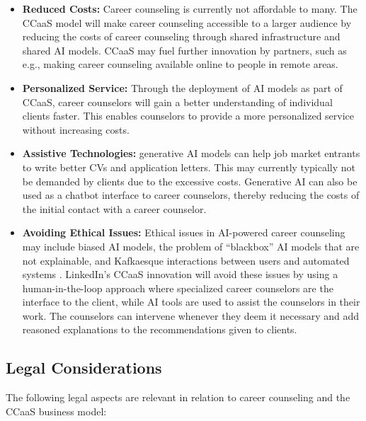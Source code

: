 \begin{itemize}
    \item \textbf{Reduced Costs:} Career counseling is currently not affordable to many. The CCaaS model
        will make career counseling accessible to a larger audience by reducing the costs of career
        counseling through shared infrastructure and shared AI models. CCaaS may fuel further innovation by 
        partners, such as e.g., making career counseling available online to people in remote areas.
    \item \textbf{Personalized Service:} Through the deployment of AI models as part of CCaaS, career counselors 
        will gain a better understanding of individual clients faster. This enables counselors to provide
        a more personalized service without increasing costs.
    \item \textbf{Assistive Technologies:} generative AI models can help job market entrants to write better CVs
        and application letters. This may currently typically not be demanded by clients due to the excessive costs.
        Generative AI can also be used as a chatbot interface to career counselors, thereby reducing the costs
        of the initial contact with a career counselor.
    \item \textbf{Avoiding Ethical Issues:} Ethical issues in AI-powered career counseling may include biased AI
        models, the problem of ``blackbox'' AI models that are not explainable, and Kafkaesque interactions between
        users and automated systems \citep{kaserAIpoweredCareerCounseling2023}. LinkedIn's CCaaS innovation will avoid 
        these issues by using a human-in-the-loop approach where specialized career counselors are the interface 
        to the client, while AI tools are used to assist the counselors in their work. The counselors can intervene
        whenever they deem it necessary and add reasoned explanations to the recommendations given to clients.
\end{itemize}


\subsection{Legal Considerations}

The following legal aspects are relevant in relation to career counseling and the CCaaS business model:

